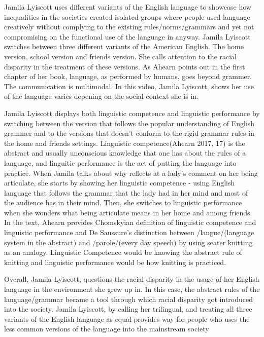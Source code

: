 \documentclass[11pt]{article}
\author{Arulselvan Madhavan}
\date{\today}
\title{}
\begin{document}
\tableofcontents

Jamila Lyiscott uses different variants of the English language to showcase how inequalities in the societies created isolated groups where people used language creatively without complying to the existing rules/norms/grammars and yet not compromising on the functional use of the language in anyway. Jamila Lyiscott switches between three different variants of the American English. The home version, school version and friends version. She calls attention to the racial disparity in the treatment of these versions. As Ahearn points out in the first chapter of her book, language, as performed by humans, goes beyond grammer. The communication is multimodal. In this video, Jamila Lyiscott, shows her use of the language varies depening on the social context she is in.

Jamila Lyiscott displays both linguistic competence and linguistic performance by switching between the version that follows the popular understanding of English grammer and to the versions that doesn't conform to the rigid grammar rules in the home and friends settings. Linguistic competence(Ahearn 2017, 17) is the abstract and usually unconscious knowledge that one has about the rules of a language, and linguitic performance is the act of putting the language into practice. When Jamila talks about why reflects at a lady's comment on her being articulate, she starts by showing her linguistic competence - using English language that follows the grammar that the lady had in her mind and most of the audience has in their mind. Then, she switches to linguistic performance when she wonders what being articulate means in her home and among friends. In the text, Ahearn provides Chomskyian definition of linguistic competence and linguistic performance and De Saussure's distinction between /langue/(language system in the abstract) and /parole/(every day speech) by using seater knitting as an analogy. Linguistic Competence would be knowing the abstract rule of knitting and linguistic performance would be how knitting is practiced.

Overall, Jamila Lyiscott, questions the racial disparity in the usage of her English language in the environment she grew up in. In this case, the abstract rules of the language/grammar became a tool through which racial disparity got introduced into the society. Jamila Lyiscott, by calling her trilingual, and treating all three variants of the English language as equal provides way for people who uses the less common versions of the language into the mainstream society
\end{document}
